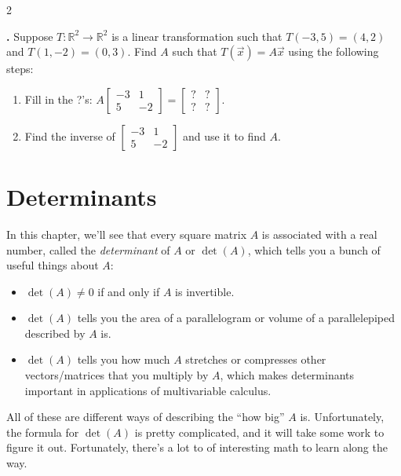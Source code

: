 \documentclass[11pt, letterpaper]{report}
\newcounter{exercise}[section]
\newcommand{\exatend}{\refstepcounter{exercise}\par%
\noindent\textbf{\theexercise.} }
\newcommand{\R}{\mathbb{R}}
\begin{document}
\begin{multicols*}{2}
\exatend \label{exercise:2.4-26} Suppose $T:\R^2\rightarrow\R^2$ is a linear transformation such that $T(-3,5) = (4,2)$ and $T(1,-2) = (0,3)$. Find $A$ such that $T(\vec{x}) = A\vec{x}$ using the following steps:
\begin{enumerate}[label=(\alph*)]
\item Fill in the ?'s: $A\begin{bmatrix}
-3 & 1 \\
5 & -2
\end{bmatrix} = \begin{bmatrix}
? & ? \\
? & ?
\end{bmatrix}$.
\item Find the inverse of $\begin{bmatrix}
-3 & 1 \\
5 & -2
\end{bmatrix}$ and use it to find $A$.
\end{enumerate}

\end{multicols*}

\chapter{Determinants}
\label{chap:determinants}



In this chapter, we'll see that every square matrix $A$ is associated with a real number, called the \emph{determinant} of $A$ or $\det(A)$, which tells you a bunch of useful things about $A$:
\begin{itemize}
\item $\det(A) \ne 0$ if and only if $A$ is invertible.
\item $\det(A)$ tells you the area of a parallelogram or volume of a parallelepiped described by $A$ is.
\item $\det(A)$ tells you how much $A$ stretches or compresses other vectors/matrices that you multiply by $A$, which makes determinants important in applications of multivariable calculus.
\end{itemize}
All of these are different ways of describing the ``how big'' $A$ is. Unfortunately, the formula for $\det(A)$ is pretty complicated, and it will take some work to figure it out. Fortunately, there's a lot to of interesting math to learn along the way.
\end{document}
